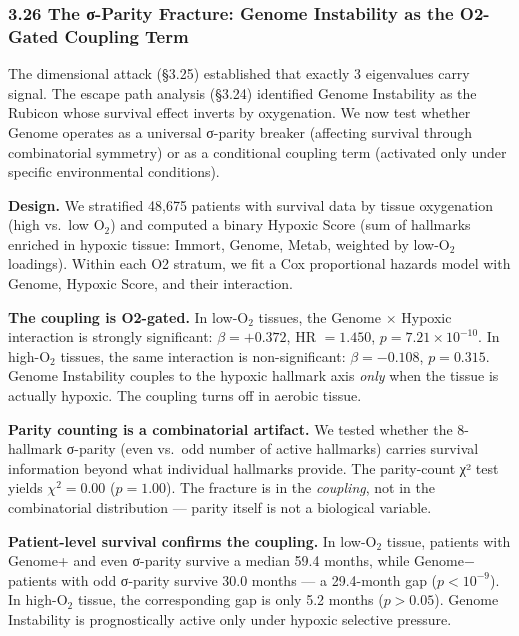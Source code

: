\documentclass[
  11pt,
]{article}
\begin{document}
\subsubsection{3.26 The σ-Parity Fracture: Genome Instability as the
O2-Gated Coupling
Term}\label{the-ux3c3-parity-fracture-genome-instability-as-the-o2-gated-coupling-term}

The dimensional attack (§3.25) established that exactly 3 eigenvalues
carry signal. The escape path analysis (§3.24) identified Genome
Instability as the Rubicon whose survival effect inverts by oxygenation.
We now test whether Genome operates as a universal σ-parity breaker
(affecting survival through combinatorial symmetry) or as a conditional
coupling term (activated only under specific environmental conditions).

\textbf{Design.} We stratified 48,675 patients with survival data by
tissue oxygenation (high vs.~low \(\mathrm{O}_2\)) and computed a binary
Hypoxic Score (sum of hallmarks enriched in hypoxic tissue: Immort,
Genome, Metab, weighted by low-\(\mathrm{O}_2\) loadings). Within each
O2 stratum, we fit a Cox proportional hazards model with Genome, Hypoxic
Score, and their interaction.

\textbf{The coupling is O2-gated.} In low-\(\mathrm{O}_2\) tissues, the
Genome \(\times\) Hypoxic interaction is strongly significant:
\(\beta = +0.372\), HR \(= 1.450\), \(p = 7.21 \times 10^{-10}\). In
high-\(\mathrm{O}_2\) tissues, the same interaction is non-significant:
\(\beta = -0.108\), \(p = 0.315\). Genome Instability couples to the
hypoxic hallmark axis \emph{only} when the tissue is actually hypoxic.
The coupling turns off in aerobic tissue.

\textbf{Parity counting is a combinatorial artifact.} We tested whether
the 8-hallmark σ-parity (even vs.~odd number of active hallmarks)
carries survival information beyond what individual hallmarks provide.
The parity-count χ² test yields \(\chi^2 = 0.00\) (\(p = 1.00\)). The
fracture is in the \emph{coupling}, not in the combinatorial
distribution --- parity itself is not a biological variable.

\textbf{Patient-level survival confirms the coupling.} In
low-\(\mathrm{O}_2\) tissue, patients with Genome+ and even σ-parity
survive a median 59.4 months, while Genome− patients with odd σ-parity
survive 30.0 months --- a 29.4-month gap (\(p < 10^{-9}\)). In
high-\(\mathrm{O}_2\) tissue, the corresponding gap is only 5.2 months
(\(p > 0.05\)). Genome Instability is prognostically active only under
hypoxic selective pressure.
\end{document}
